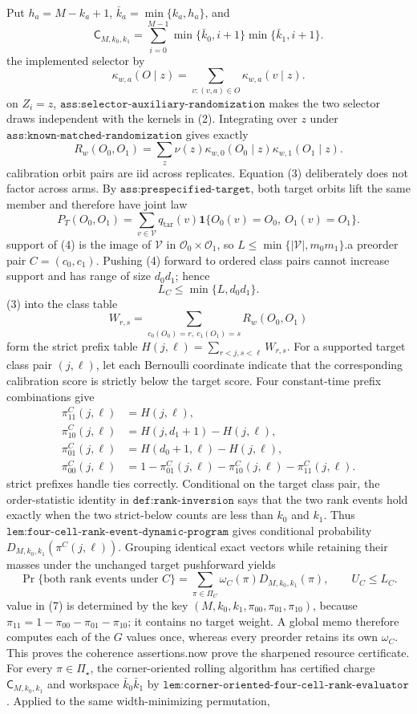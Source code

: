 Put \(h_a=M-k_a+1\), \(\bar k_a=\min\{k_a,h_a\}\), and\n\[\mathsf C_{M,k_0,k_1}=\sum_{i=0}^{M-1}\min\{\bar k_0,i+1\}\min\{\bar k_1,i+1\}.\tag{1}\]\nAggregate the implemented selector by\n\[\kappa_{w,a}(O\mid z)=\sum_{v:(v,a)\in O}\kappa_{w,a}(v\mid z).\tag{2}\]\nConditional on \(Z_i=z\), \(\texttt{ass:selector-auxiliary-randomization}\) makes the two selector draws independent with the kernels in (2). Integrating over \(z\) under \(\texttt{ass:known-matched-randomization}\) gives exactly\n\[R_w(O_0,O_1)=\sum_z\nu(z)\kappa_{w,0}(O_0\mid z)\kappa_{w,1}(O_1\mid z).\tag{3}\]\nThe calibration orbit pairs are iid across replicates. Equation (3) deliberately does not factor across arms. By \(\texttt{ass:prespecified-target}\), both target orbits lift the same member and therefore have joint law\n\[P_T(O_0,O_1)=\sum_{v\in\mathcal V}q_{\mathrm{tar}}(v)\mathbf 1\{O_0(v)=O_0,\ O_1(v)=O_1\}.\tag{4}\]\nThe support of (4) is the image of \(\mathcal V\) in \(\mathcal O_0\times\mathcal O_1\), so \(L\le\min\{|\mathcal V|,m_0m_1\}\).\n\nFix a preorder pair \(C=(c_0,c_1)\). Pushing (4) forward to ordered class pairs cannot increase support and has range of size \(d_0d_1\); hence\n\[L_C\le\min\{L,d_0d_1\}.\tag{5}\]\nAggregate (3) into the class table\n\[W_{r,s}=\sum_{c_0(O_0)=r,\ c_1(O_1)=s}R_w(O_0,O_1)\]\nand form the strict prefix table \(H(j,\ell)=\sum_{r<j,s<\ell}W_{r,s}\). For a supported target class pair \((j,\ell)\), let each Bernoulli coordinate indicate that the corresponding calibration score is strictly below the target score. Four constant-time prefix combinations give\n\[\begin{aligned}\pi^C_{11}(j,\ell)&=H(j,\ell),\\\pi^C_{10}(j,\ell)&=H(j,d_1+1)-H(j,\ell),\\\pi^C_{01}(j,\ell)&=H(d_0+1,\ell)-H(j,\ell),\\\pi^C_{00}(j,\ell)&=1-\pi^C_{01}(j,\ell)-\pi^C_{10}(j,\ell)-\pi^C_{11}(j,\ell).\end{aligned}\tag{6}\]\nThe strict prefixes handle ties correctly. Conditional on the target class pair, the order-statistic identity in \(\texttt{def:rank-inversion}\) says that the two rank events hold exactly when the two strict-below counts are less than \(k_0\) and \(k_1\). Thus \(\texttt{lem:four-cell-rank-event-dynamic-program}\) gives conditional probability \(D_{M,k_0,k_1}(\pi^C(j,\ell))\). Grouping identical exact vectors while retaining their masses under the unchanged target pushforward yields\n\[\Pr\{\text{both rank events under }C\}=\sum_{\pi\in\Pi_C}\omega_C(\pi)D_{M,k_0,k_1}(\pi),\qquad U_C\le L_C.\tag{7}\]\nThe value in (7) is determined by the key \((M,k_0,k_1,\pi_{00},\pi_{01},\pi_{10})\), because \(\pi_{11}=1-\pi_{00}-\pi_{01}-\pi_{10}\); it contains no target weight. A global memo therefore computes each of the \(G\) values once, whereas every preorder retains its own \(\omega_C\). This proves the coherence assertions.\n\nWe now prove the sharpened resource certificate. For every \(\pi\in\Pi_\star\), the corner-oriented rolling algorithm has certified charge \(\mathsf C_{M,k_0,k_1}\) and workspace \(\bar k_0\bar k_1\) by \(\texttt{lem:corner-oriented-four-cell-rank-evaluator}\). Applied to the same width-minimizing permutation, 